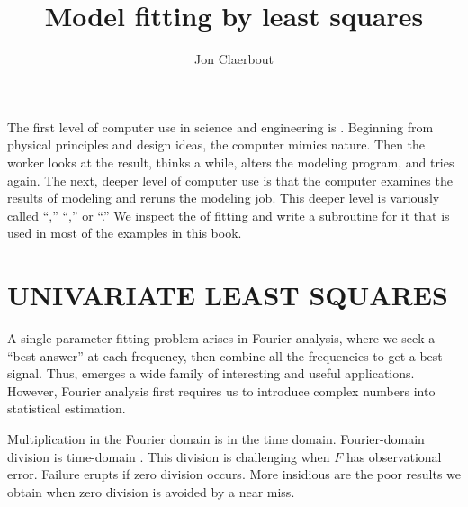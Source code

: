 
\title{Model fitting by least squares}
\author{Jon Claerbout}

\maketitle

\label{paper:lsq}

\def\ff{{\bf f}}
\def\dd{{\bf d}}

\par
The first level of computer use in science and engineering is .
Beginning from physical principles and design ideas,
the computer mimics nature.
Then the worker looks at the result, thinks a while,
alters the modeling program, and tries again.
The next, deeper level of computer use is that the computer 
examines the results of modeling and reruns the modeling job.
This deeper level
is variously called
``,'' 
``,'' or
``.''
We inspect the  of fitting
and write a subroutine for it that is used in most of
the examples in this book.

\section{UNIVARIATE LEAST SQUARES}
A single parameter fitting problem arises in Fourier analysis,
where we seek a ``best answer'' at each frequency,
then combine all the frequencies to get a best signal.
Thus, emerges a wide family of interesting and useful applications.
However, Fourier analysis first requires us to introduce complex numbers
into statistical estimation.
\par
Multiplication in the Fourier domain is  in the time domain.
Fourier-domain division is time-domain .
This division is challenging when $F$ has observational error.
Failure erupts if zero division occurs.
More insidious are the poor results we obtain
when zero division is avoided by a near miss.

